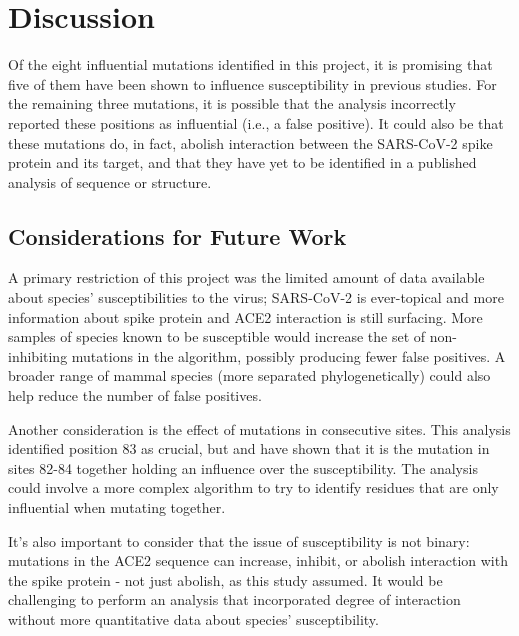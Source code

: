 \section{Discussion}

Of the eight influential mutations identified in this project, it is promising that five of them have been shown to influence susceptibility in previous studies. For the remaining three mutations, it is possible that the analysis incorrectly reported these positions as influential (i.e., a false positive). It could also be that these mutations do, in fact, abolish interaction between the SARS-CoV-2 spike protein and its target, and that they have yet to be identified in a published analysis of sequence or structure.

\subsection{Considerations for Future Work}

A primary restriction of this project was the limited amount of data available about species' susceptibilities to the virus; SARS-CoV-2 is ever-topical and more information about spike protein and ACE2 interaction is still surfacing. More samples of species known to be susceptible would increase the set of non-inhibiting mutations in the algorithm, possibly producing fewer false positives. A broader range of mammal species (more separated phylogenetically) could also help reduce the number of false positives.

Another consideration is the effect of mutations in consecutive sites. This analysis identified position 83 as crucial, but \textcite{Li} and \textcite{LiQin} have shown that it is the mutation in sites 82-84 together holding an influence over the susceptibility. The analysis could involve a more complex algorithm to try to identify residues that are only influential when mutating together.

It's also important to consider that the issue of susceptibility is not binary: mutations in the ACE2 sequence can increase, inhibit, or abolish interaction with the spike protein \cite{UniProt} - not just abolish, as this study assumed. It would be challenging to perform an analysis that incorporated degree of interaction without more quantitative data about species' susceptibility.